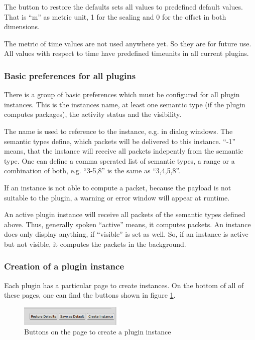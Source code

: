 The button to restore the defaults sets all values to predefined default values. That is ``m'' as metric unit, 1 for the scaling
and 0 for the offset in both dimensions.

The metric of time values are not used anywhere yet. So they are for future use. All values with respect to time have predefined
timeunits in all current plugins.

\subsubsection{Basic preferences for all plugins}
There is a group of basic preferences which must be configured for all plugin instances. This is the instances name,
at least one semantic type (if the plugin computes packages), the activity status and the visibility.

The name is used to reference to the instance, e.g. in dialog windows. The semantic types define, which packets
will be delivered to this instance. ``-1'' means, that the instance will receive all packets indepently from the
semantic type. One can define a comma sperated list of semantic types, a range or a combination of both, e.g.
``3-5,8'' is the same as ``3,4,5,8''.

If an instance is not able to compute a packet, because the payload is not
suitable to the plugin, a warning or error window will appear at runtime.

An active plugin instance will receive all packets of the semantic types defined above. Thus, generally spoken
``active'' means, it computes packets. An instance does only display anything, if ``visible'' is set as well.
So, if an instance is active but not visible, it computes the packets in the background.

\subsubsection{Creation of a plugin instance}

Each plugin has a particular page to create instances. On the bottom of all of these pages, one can find the buttons
shown in figure \ref{pic:instance_creation_buttons}.

\begin{figure}[htb]
  \begin{center}
    \includegraphics[width=5cm]{./pics/plugin_creation_buttons}
    \caption{Buttons on the page to create a plugin instance}
    \label{pic:instance_creation_buttons}
  \end{center}
\end{figure}

